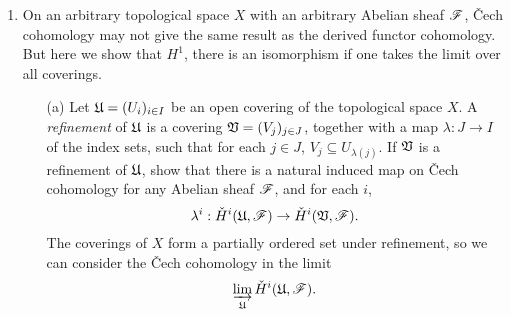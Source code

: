 \documentclass[a4paper]{article}
\begin{document}
\begin{enumerate} [label=\textbf{\arabic*.}, leftmargin=0em]
\begin{proof}
  Let $\goth{U}$ be the open covering by the two open sets $V = X - \{ x = 0 \}$ and $U = X - \{ y = 0 \}$, with affine coordinates obtained by restricting the ones from $X$.
  Then the Čech complex has only two terms:
  \begin{align*}
    C^0 & = \Gamma(V, \fO_V) \times \Gamma(W, \fO_W), \\
    C^1 & = \Gamma(V \cap W, \fO_{V \cap W}).
  \end{align*}
  Now
  \begin{align*}
    \Gamma(V, \Omega) & = k\bigg[ x, \frac{1}{x}, y \bigg] \\
    \Gamma(W, \Omega) & = k\bigg[ x, y, \frac{1}{y}\bigg] \\
    \Gamma(V, W, \Omega) & = k\bigg[ x, y, \frac{1}{x}, \frac{1}{y} \bigg] 
  \end{align*}
  and the map $d : C^0 \to C^1$ is given by $(f, g) \mapsto f - g$. To compute $H^1$, the image of $d$ is the set of all expressions $x^i y^j$ where at least one of $i, j$ is non-negative. Hence, $H^1(U, \fO_U)$ is spanned by $\{ x^iy^j \mid i, j < 0 \}$.
\end{proof}

\item On an arbitrary topological space $X$ with an arbitrary Abelian sheaf $\mathscr{F}$, Čech cohomology may not give the same result as the derived functor cohomology.
But here we show that $H^1$, there is an isomorphism if one takes the limit over all coverings.
\begin{itemize}
  \item[(a)] Let $\mathfrak{U} = (U_i)_{i \in I}$ be an open covering of the topological space $X$.
  A \textit{refinement} of $\goth{U}$ is a covering $\mathfrak{V} = (V_j)_{j \in J}$, together with a map $\lambda : J \to I$ of the index sets, such that for each $j \in J$, $V_j \subseteq U_{\lambda(j)}$.
  If $\mathfrak{V}$ is a refinement of $\goth{U}$, show that there is a natural induced map on Čech cohomology for any Abelian sheaf $\mathscr{F}$, and for each $i$,
  \begin{equation*}
    \lambda^i : \check{H}^i(\mathfrak{U}, \mathscr{F}) \to \check{H}^i(\mathfrak{V}, \mathscr{F}).
  \end{equation*}
  The coverings of $X$ form a partially ordered set under refinement, so we can consider the Čech cohomology in the limit
  \begin{equation*}
    \varinjlim_{\mathfrak{U}} \check{H}^i(\mathfrak{U}, \mathscr{F}).
  \end{equation*}


\end{itemize}
\end{enumerate}
\end{document}
